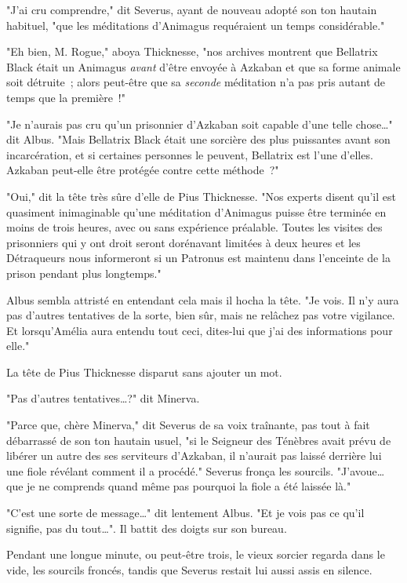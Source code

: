 "J'ai cru comprendre," dit Severus, ayant de nouveau adopté son ton hautain habituel, "que les méditations d'Animagus requéraient un temps considérable."

"Eh bien, M. Rogue," aboya Thicknesse, "nos archives montrent que Bellatrix Black était un Animagus \emph{avant} d'être envoyée à Azkaban et que sa forme animale soit détruite~; alors peut-être que sa \emph{seconde} méditation n'a pas pris autant de temps que la première~!"

"Je n'aurais pas cru qu'un prisonnier d'Azkaban soit capable d'une telle chose…" dit Albus. "Mais Bellatrix Black était une sorcière des plus puissantes avant son incarcération, et si certaines personnes le peuvent, Bellatrix est l'une d'elles. Azkaban peut-elle être protégée contre cette méthode~?"

"Oui," dit la tête très sûre d'elle de Pius Thicknesse. "Nos experts disent qu'il est quasiment inimaginable qu'une méditation d'Animagus puisse être terminée en moins de trois heures, avec ou sans expérience préalable. Toutes les visites des prisonniers qui y ont droit seront dorénavant limitées à deux heures et les Détraqueurs nous informeront si un Patronus est maintenu dans l'enceinte de la prison pendant plus longtemps."

Albus sembla attristé en entendant cela mais il hocha la tête. "Je vois. Il n'y aura pas d'autres tentatives de la sorte, bien sûr, mais ne relâchez pas votre vigilance. Et lorsqu'Amélia aura entendu tout ceci, dites-lui que j'ai des informations pour elle."

La tête de Pius Thicknesse disparut sans ajouter un mot.

"Pas d'autres tentatives…?" dit Minerva.

"Parce que, chère Minerva," dit Severus de sa voix traînante, pas tout à fait débarrassé de son ton hautain usuel, "si le Seigneur des Ténèbres avait prévu de libérer un autre des ses serviteurs d'Azkaban, il n'aurait pas laissé derrière lui une fiole révélant comment il a procédé." Severus fronça les sourcils. "J'avoue… que je ne comprends quand même pas pourquoi la fiole a été laissée là."

"C'est une sorte de message…" dit lentement Albus. "Et je vois pas ce qu'il signifie, pas du tout…". Il battit des doigts sur son bureau.

Pendant une longue minute, ou peut-être trois, le vieux sorcier regarda dans le vide, les sourcils froncés, tandis que Severus restait lui aussi assis en silence.

